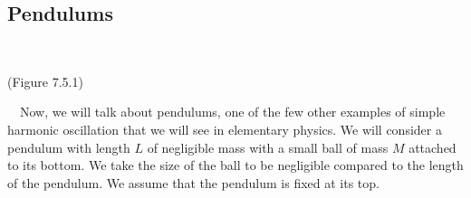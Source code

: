 \documentclass{article}[gray]
\numberwithin{equation}{subsection}
\begin{document}
\subsection{Pendulums}
\
\
\
\begin{center}
(Figure 7.5.1)
\end{center}
\ 
\
Now, we will talk about pendulums, one of the few other examples of simple harmonic oscillation that we will see in elementary physics. We will consider a pendulum with length $L$ of negligible mass with a small ball of mass $M$ attached to its bottom. We take the size of the ball to be negligible compared to the length of the pendulum. We assume that the pendulum is fixed at its top. 
\end{document}
